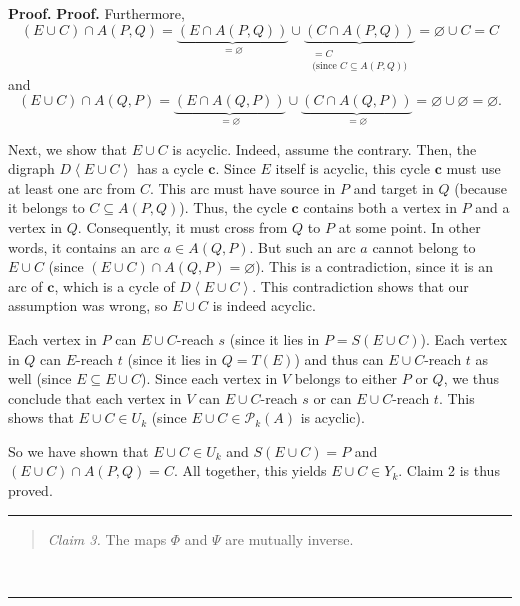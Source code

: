 \documentclass[numbers=enddot,12pt,final,onecolumn,notitlepage]{scrartcl}%
\theoremstyle{definition}
\newenvironment{statement}{\begin{quote}}{\end{quote}}
\newenvironment{proof}[1][Proof]{\noindent\textbf{#1.} }{\ \rule{0.5em}{0.5em}}
\theoremstyle{plainsl}
\begin{document}
\begin{proof}
\begin{proof}
Furthermore,%
\[
\left(  E\cup C\right)  \cap A\left(  P,Q\right)  =\underbrace{\left(  E\cap
A\left(  P,Q\right)  \right)  }_{=\varnothing}\cup\underbrace{\left(  C\cap
A\left(  P,Q\right)  \right)  }_{\substack{=C\\\text{(since }C\subseteq
A\left(  P,Q\right)  \text{)}}}=\varnothing\cup C=C
\]
and%
\[
\left(  E\cup C\right)  \cap A\left(  Q,P\right)  =\underbrace{\left(  E\cap
A\left(  Q,P\right)  \right)  }_{=\varnothing}\cup\underbrace{\left(  C\cap
A\left(  Q,P\right)  \right)  }_{=\varnothing}=\varnothing\cup\varnothing
=\varnothing.
\]


Next, we show that $E\cup C$ is acyclic. Indeed, assume the contrary. Then,
the digraph $D\left\langle E\cup C\right\rangle $ has a cycle $\mathbf{c}$.
Since $E$ itself is acyclic, this cycle $\mathbf{c}$ must use at least one arc
from $C$. This arc must have source in $P$ and target in $Q$ (because it
belongs to $C\subseteq A\left(  P,Q\right)  $). Thus, the cycle $\mathbf{c}$
contains both a vertex in $P$ and a vertex in $Q$. Consequently, it must cross
from $Q$ to $P$ at some point. In other words, it contains an arc $a\in
A\left(  Q,P\right)  $. But such an arc $a$ cannot belong to $E\cup C$ (since
$\left(  E\cup C\right)  \cap A\left(  Q,P\right)  =\varnothing$). This is a
contradiction, since it is an arc of $\mathbf{c}$, which is a cycle of
$D\left\langle E\cup C\right\rangle $. This contradiction shows that our
assumption was wrong, so $E\cup C$ is indeed acyclic.

Each vertex in $P$ can $E\cup C$-reach $s$ (since it lies in $P=S\left(  E\cup
C\right)  $). Each vertex in $Q$ can $E$-reach $t$ (since it lies in
$Q=T\left(  E\right)  $) and thus can $E\cup C$-reach $t$ as well (since
$E\subseteq E\cup C$). Since each vertex in $V$ belongs to either $P$ or $Q$,
we thus conclude that each vertex in $V$ can $E\cup C$-reach $s$ or can $E\cup
C$-reach $t$. This shows that $E\cup C\in U_{k}$ (since $E\cup C\in
\mathcal{P}_{k}\left(  A\right)  $ is acyclic).

So we have shown that $E\cup C\in U_{k}$ and $S\left(  E\cup C\right)  =P$ and
$\left(  E\cup C\right)  \cap A\left(  P,Q\right)  =C$. All together, this
yields $E\cup C\in Y_{k}$. Claim 2 is thus proved.
\end{proof}

\begin{statement}
\textit{Claim 3.} The maps $\Phi$ and $\Psi$ are mutually inverse.
\end{statement}


\end{proof}
\end{document}
